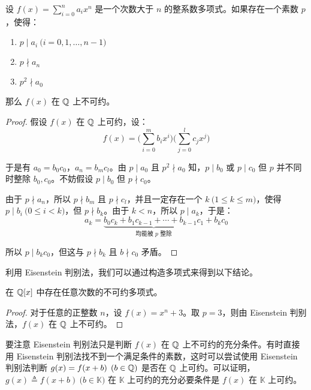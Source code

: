 \begin{theorem}
	设 $f(x) = \sum\limits_{i = 0}^n a_i x^n$ 是一个次数大于 $n$ 的整系数多项式。如果存在一个素数 $p$，使得：
	\begin{enumerate}
		\item $p \mid a_i \pod{i = 0, 1, \ldots, n - 1}$
		\item $p \nmid a_n$
		\item $p^2 \nmid a_0$
	\end{enumerate}

	那么 $f(x)$ 在 $\mathbb Q$ 上不可约。
\end{theorem}

\begin{proof}
	假设 $f(x)$ 在 $\mathbb Q$ 上可约，设：
	$$
	f(x) = \biggl( \sum\limits_{i = 0}^m b_i x^i \biggr) \biggl( \sum\limits_{j = 0}^l c_j x^j \biggr)
	$$

	于是有 $a_0 = b_0 c_0$，$a_n = b_m c_l$。由 $p \mid a_0$ 且 $p^2 \nmid a_0$ 知，$p \mid b_0$ 或 $p \mid c_0$ 但 $p$ 并不同时整除 $b_0, c_0$。不妨假设 $p \mid b_0$ 但 $p \nmid c_0$。

	由于 $p \nmid a_n$，所以 $p \nmid b_m$ 且 $p \nmid c_l$，并且一定存在一个 $k \pod{1 \le k \le m}$，使得 $p \mid b_i \pod{0 \le i < k}$，但 $p \nmid b_k$。由于 $k < n$，所以 $p \mid a_k$，于是：
	$$
	a_k = \underset{\text{均能被 $p$ 整除}}{\underbrace{b_0 c_k + b_1 c_{k - 1} + \cdots + b_{k - 1} c_1}} + b_k c_0
	$$

	所以 $p \mid b_k c_0$，但这与 $p \nmid b_k$ 且 $b \nmid c_0$ 矛盾。
\end{proof}

利用 Eisenstein 判别法，我们可以通过构造多项式来得到以下结论。

\begin{proposition}
	在 $\mathbb Q[x]$ 中存在任意次数的不可约多项式。
\end{proposition}

\begin{proof}
	对于任意的正整数 $n$，设 $f(x) = x^n + 3$。取 $p = 3$，则由 Eisenstein 判别法，$f(x)$ 在 $\mathbb Q$ 上不可约。
\end{proof}

要注意 Eisenstein 判别法只是判断 $f(x)$ 在 $\mathbb Q$ 上不可约的充分条件。有时直接用 Eisenstein 判别法找不到一个满足条件的素数，这时可以尝试使用 Eisenstein 判别法判断 $g(x) = f(x + b) \pod{b \in \mathbb Q}$ 是否在 $\mathbb Q$ 上可约。可以证明，$g(x) \triangleq f(x + b) \pod{b \in \mathbb K}$ 在 $\mathbb K$ 上可约的充分必要条件是 $f(x)$ 在 $\mathbb K$ 上可约。